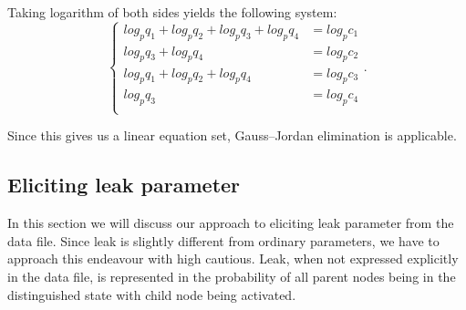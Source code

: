 Taking logarithm of both sides yields the following system:
\begin{equation}
\begin{cases}
    log_p{q_1} + log_p{q_2} + log_p{q_3} + log_p{q_4} &= log_p{c_1}\\
    log_p{q_3} + log_p{q_4} &= log_p{c_2}\\
    log_p{q_1} + log_p{q_2} + log_p{q_4} &= log_p{c_3}\\
    log_p{q_3} &= log_p{c_4}\\
\end{cases}.
\end{equation}

Since this gives us a linear equation set, Gauss--Jordan elimination is applicable.
\subsection{Eliciting leak parameter}
In this section we will discuss our approach to eliciting leak parameter from the data file.
Since leak is slightly different from ordinary parameters, we have to approach this endeavour with high cautious.
Leak, when not expressed explicitly in the data file, is represented in the probability of all parent nodes being in the distinguished state with child node being activated.
%  
%
%
%    
%
%

